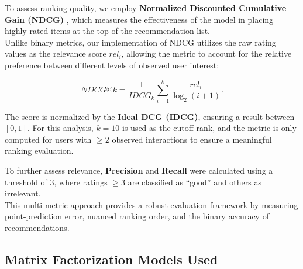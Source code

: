 \documentclass[conference]{IEEEtran}
\begin{document}
To assess ranking quality, we employ \textbf{Normalized Discounted Cumulative Gain (NDCG)} \cite{Jarvelin2002}, which measures the effectiveness of the model in placing highly-rated items at the top of the recommendation list.\\
\indent Unlike binary metrics, our implementation of NDCG utilizes the raw rating values as the relevance score $rel_i$, allowing the metric to account for the relative preference between different levels of observed user interest:

\begin{equation}
	NDCG@k = \frac{1}{IDCG_{k}} \sum_{i=1}^{k} \frac{rel_i}{\log_2(i + 1)}.
\end{equation}

The score is normalized by the \textbf{Ideal DCG (IDCG)}, ensuring a result between $[0, 1]$. For this analysis, $k=10$ is used as the cutoff rank, and the metric is only computed for users with $\ge 2$ observed interactions to ensure a meaningful ranking evaluation.

\indent To further assess relevance, \textbf{Precision} and \textbf{Recall} \cite{ISLR2} were calculated using a threshold of 3, where ratings $\ge 3$ are classified as ``good'' and others as irrelevant.\\
\indent This multi-metric approach provides a robust evaluation framework by measuring point-prediction error, nuanced ranking order, and the binary accuracy of recommendations.

\vspace{2mm}

\subsection{\textbf{Matrix Factorization Models Used}}
\end{document}
